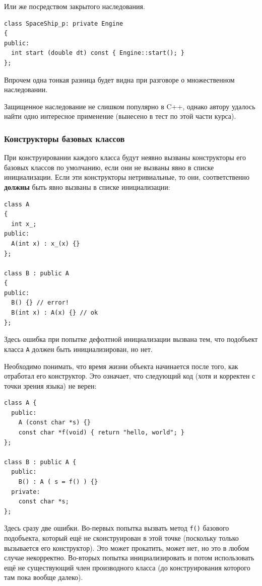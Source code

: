 \documentclass[a4paper,12pt,oneside]{article}
\begin{document}
Или же посредством закрытого наследования.

\begin{lstlisting}
class SpaceShip_p: private Engine
{
public:
  int start (double dt) const { Engine::start(); }
};
\end{lstlisting}

Впрочем одна тонкая разница будет видна при разговоре о множественном наследовании.

Защищенное наследование не слишком популярно в C++, однако автору удалось найти одно интересное применение (вынесено в тест по этой части курса).

\subsubsection{Конструкторы базовых классов}\label{BaseClassConstr}

При конструировании каждого класса будут неявно вызваны конструкторы его базовых классов по умолчанию, если они не вызваны явно в списке инициализации. Если эти конструкторы нетривиальные, то они, соответственно \textbf{должны} быть явно вызваны в списке инициализации:

\begin{lstlisting}
class A
{
  int x_;
public:
  A(int x) : x_(x) {}
};

class B : public A
{
public:
  B() {} // error!
  B(int x) : A(x) {} // ok
};
\end{lstlisting}

Здесь ошибка при попытке дефолтной инициализации вызвана тем, что подобъект класса \lstinline!A! должен быть инициализирован, но нет.

Необходимо понимать, что время жизни объекта начинается после того, как отработал его конструктор. Это означает, что следующий код (хотя и корректен с точки зрения языка) не верен:

\begin{lstlisting}
class A {
  public:
    A (const char *s) {}
    const char *f(void) { return "hello, world"; }
};

class B : public A {
  public:
    B() : A ( s = f() ) {}
  private:
    const char *s;
};
\end{lstlisting}

Здесь сразу две ошибки. Во-первых попытка вызвать метод \lstinline!f()! базового подобъекта, который ещё не сконструирован в этой точке (поскольку только вызывается его конструктор). Это может прокатить, может нет, но это в любом случае некорректно. Во-вторых попытка инициализировать и потом использовать ещё не существующий член производного класса (до конструирования которого там пока вообще далеко).
\end{document}
